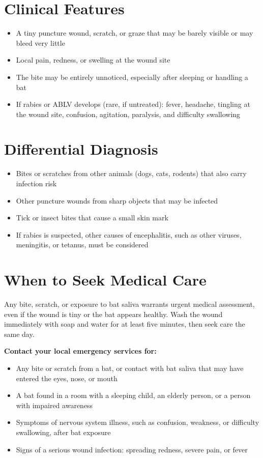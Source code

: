 \section*{Clinical Features}
\begin{itemize}
    \item A tiny puncture wound, scratch, or graze that may be barely visible or may bleed very little
    \item Local pain, redness, or swelling at the wound site
    \item The bite may be entirely unnoticed, especially after sleeping or handling a bat
    \item If rabies or ABLV develops (rare, if untreated): fever, headache, tingling at the wound site, confusion, agitation, paralysis, and difficulty swallowing
\end{itemize}

\section*{Differential Diagnosis}
\begin{itemize}
    \item Bites or scratches from other animals (dogs, cats, rodents) that also carry infection risk
    \item Other puncture wounds from sharp objects that may be infected
    \item Tick or insect bites that cause a small skin mark
    \item If rabies is suspected, other causes of encephalitis, such as other viruses, meningitis, or tetanus, must be considered
\end{itemize}

\section*{When to Seek Medical Care}
Any bite, scratch, or exposure to bat saliva warrants urgent medical assessment, even if the wound is tiny or the bat appears healthy. Wash the wound immediately with soap and water for at least five minutes, then seek care the same day.

\textbf{Contact your local emergency services for:}
\begin{itemize}
    \item Any bite or scratch from a bat, or contact with bat saliva that may have entered the eyes, nose, or mouth
    \item A bat found in a room with a sleeping child, an elderly person, or a person with impaired awareness
    \item Symptoms of nervous system illness, such as confusion, weakness, or difficulty swallowing, after bat exposure
    \item Signs of a serious wound infection: spreading redness, severe pain, or fever
\end{itemize}

